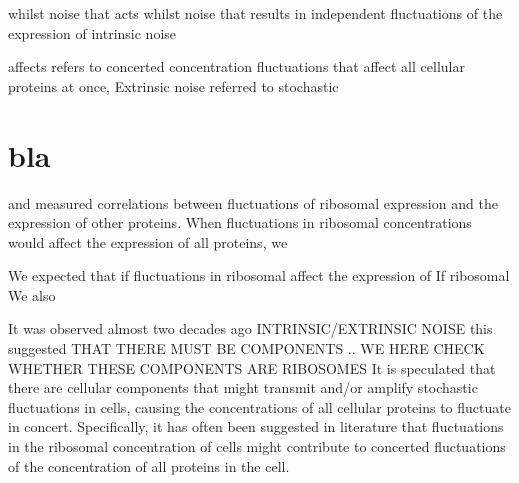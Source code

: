 whilst noise that acts 
whilst noise that results in independent fluctuations of the expression of intrinsic noise 

affects 
refers to concerted concentration fluctuations that affect all cellular proteins at once, 
Extrinsic noise referred to stochastic 



\section{bla}


and measured correlations between fluctuations of ribosomal expression and the expression of other proteins.
%
When fluctuations in ribosomal concentrations would affect the expression of all proteins, we 

We expected that if fluctuations in ribosomal affect the expression of 
If ribosomal 
%
We also 


It was observed almost two decades ago 
INTRINSIC/EXTRINSIC NOISE
this suggested 
THAT THERE MUST BE COMPONENTS ..
WE HERE CHECK WHETHER THESE COMPONENTS ARE RIBOSOMES
%
%
It is speculated that there are cellular components that might transmit and/or amplify stochastic fluctuations in cells, 
causing the concentrations of all cellular proteins to fluctuate in concert.
%
%
%
Specifically, it has often been suggested in literature that fluctuations in the ribosomal concentration of cells might contribute to 
concerted fluctuations of the concentration of all proteins in the cell. 
%



%
%
%
%





